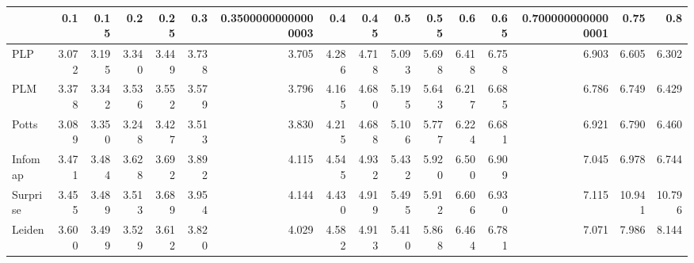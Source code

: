 \begin{tabular}{lrrrrrrrrrrrrrrr}
\toprule
{} &   0.1 &  0.15 &   0.2 &  0.25 &   0.3 & 0.35000000000000003 &   0.4 &  0.45 &   0.5 &  0.55 &   0.6 &  0.65 & 0.7000000000000001 &   0.75 &    0.8 \\
\midrule
PLP      & 3.072 & 3.195 & 3.340 & 3.449 & 3.738 &               3.705 & 4.286 & 4.718 & 5.093 & 5.698 & 6.418 & 6.758 &              6.903 &  6.605 &  6.302 \\
PLM      & 3.378 & 3.342 & 3.536 & 3.552 & 3.579 &               3.796 & 4.165 & 4.680 & 5.195 & 5.643 & 6.217 & 6.685 &              6.786 &  6.749 &  6.429 \\
Potts    & 3.089 & 3.350 & 3.248 & 3.427 & 3.513 &               3.830 & 4.215 & 4.688 & 5.106 & 5.777 & 6.224 & 6.681 &              6.921 &  6.790 &  6.460 \\
Infomap  & 3.471 & 3.484 & 3.628 & 3.692 & 3.892 &               4.115 & 4.545 & 4.932 & 5.432 & 5.920 & 6.500 & 6.909 &              7.045 &  6.978 &  6.744 \\
Surprise & 3.455 & 3.489 & 3.513 & 3.689 & 3.954 &               4.144 & 4.430 & 4.919 & 5.495 & 5.912 & 6.606 & 6.930 &              7.115 & 10.941 & 10.796 \\
Leiden   & 3.600 & 3.499 & 3.529 & 3.612 & 3.820 &               4.029 & 4.582 & 4.913 & 5.410 & 5.868 & 6.464 & 6.781 &              7.071 &  7.986 &  8.144 \\
\bottomrule
\end{tabular}
